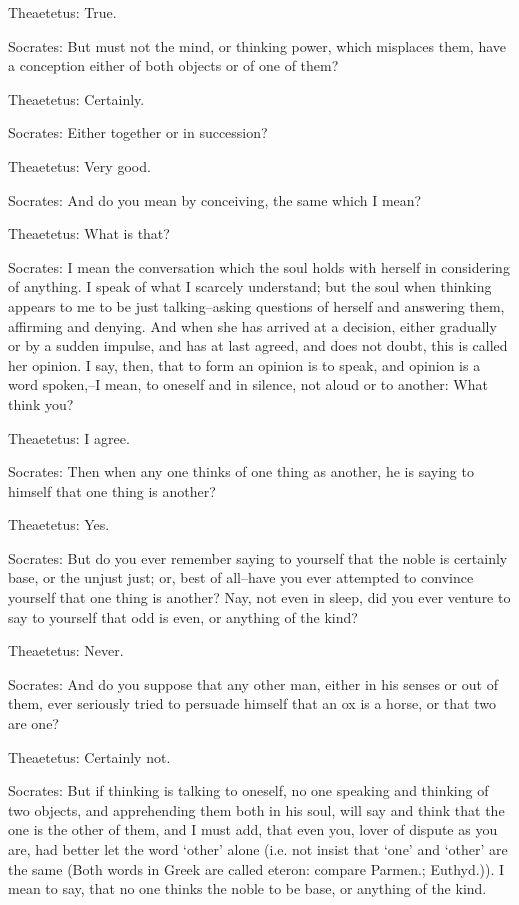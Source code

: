 Theaetetus: True.

Socrates: But must not the mind, or thinking power, which misplaces
them, have a conception either of both objects or of one of them?

Theaetetus: Certainly.

Socrates: Either together or in succession?

Theaetetus: Very good.

Socrates: And do you mean by conceiving, the same which I mean?

Theaetetus: What is that?

Socrates: I mean the conversation which the soul holds with herself in
considering of anything. I speak of what I scarcely understand; but the
soul when thinking appears to me to be just talking--asking questions
of herself and answering them, affirming and denying. And when she has
arrived at a decision, either gradually or by a sudden impulse, and has
at last agreed, and does not doubt, this is called her opinion. I
say, then, that to form an opinion is to speak, and opinion is a word
spoken,--I mean, to oneself and in silence, not aloud or to another:
What think you?

Theaetetus: I agree.

Socrates: Then when any one thinks of one thing as another, he is saying
to himself that one thing is another?

Theaetetus: Yes.

Socrates: But do you ever remember saying to yourself that the noble
is certainly base, or the unjust just; or, best of all--have you ever
attempted to convince yourself that one thing is another? Nay, not even
in sleep, did you ever venture to say to yourself that odd is even, or
anything of the kind?

Theaetetus: Never.

Socrates: And do you suppose that any other man, either in his senses
or out of them, ever seriously tried to persuade himself that an ox is a
horse, or that two are one?

Theaetetus: Certainly not.

Socrates: But if thinking is talking to oneself, no one speaking and
thinking of two objects, and apprehending them both in his soul, will
say and think that the one is the other of them, and I must add, that
even you, lover of dispute as you are, had better let the word `other'
alone (i.e. not insist that `one' and `other' are the same (Both words
in Greek are called eteron: compare Parmen.; Euthyd.)). I mean to say,
that no one thinks the noble to be base, or anything of the kind.

